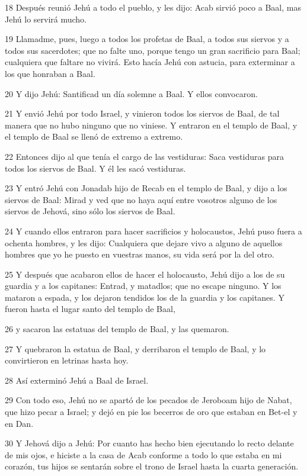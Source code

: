 \par 18 Después reunió Jehú a todo el pueblo, y les dijo: Acab sirvió poco a Baal, mas Jehú lo servirá mucho.
\par 19 Llamadme, pues, luego a todos los profetas de Baal, a todos sus siervos y a todos sus sacerdotes; que no falte uno, porque tengo un gran sacrificio para Baal; cualquiera que faltare no vivirá. Esto hacía Jehú con astucia, para exterminar a los que honraban a Baal.
\par 20 Y dijo Jehú: Santificad un día solemne a Baal. Y ellos convocaron.
\par 21 Y envió Jehú por todo Israel, y vinieron todos los siervos de Baal, de tal manera que no hubo ninguno que no viniese. Y entraron en el templo de Baal, y el templo de Baal se llenó de extremo a extremo.
\par 22 Entonces dijo al que tenía el cargo de las vestiduras: Saca vestiduras para todos los siervos de Baal. Y él les sacó vestiduras.
\par 23 Y entró Jehú con Jonadab hijo de Recab en el templo de Baal, y dijo a los siervos de Baal: Mirad y ved que no haya aquí entre vosotros alguno de los siervos de Jehová, sino sólo los siervos de Baal.
\par 24 Y cuando ellos entraron para hacer sacrificios y holocaustos, Jehú puso fuera a ochenta hombres, y les dijo: Cualquiera que dejare vivo a alguno de aquellos hombres que yo he puesto en vuestras manos, su vida será por la del otro.
\par 25 Y después que acabaron ellos de hacer el holocausto, Jehú dijo a los de su guardia y a los capitanes: Entrad, y matadlos; que no escape ninguno. Y los mataron a espada, y los dejaron tendidos los de la guardia y los capitanes. Y fueron hasta el lugar santo del templo de Baal,
\par 26 y sacaron las estatuas del templo de Baal, y las quemaron.
\par 27 Y quebraron la estatua de Baal, y derribaron el templo de Baal, y lo convirtieron en letrinas hasta hoy.
\par 28 Así exterminó Jehú a Baal de Israel.
\par 29 Con todo eso, Jehú no se apartó de los pecados de Jeroboam hijo de Nabat, que hizo pecar a Israel; y dejó en pie los becerros de oro que estaban en Bet-el y en Dan. 
\par 30 Y Jehová dijo a Jehú: Por cuanto has hecho bien ejecutando lo recto delante de mis ojos, e hiciste a la casa de Acab conforme a todo lo que estaba en mi corazón, tus hijos se sentarán sobre el trono de Israel hasta la cuarta generación.

